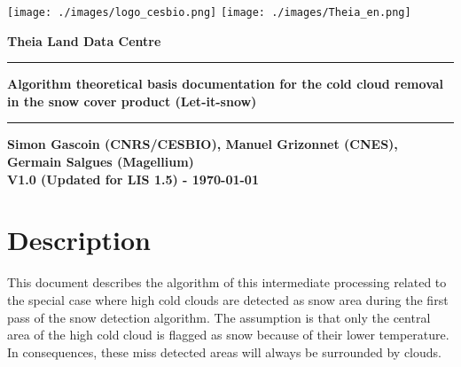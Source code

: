 \documentclass[a4paper]{article}
\date{\today}
\renewcommand{\maketitle}{}
\begin{document}
\maketitle
\pagestyle{fancy}
\rhead[]{\thepage}

\begin{titlepage}
\texttt{[image: ./images/logo\_cesbio.png]}
\hspace{5cm}
\texttt{[image: ./images/Theia\_en.png]}

\vspace{3cm}



\textcolor{PineGreen}{ \huge \bfseries Theia Land Data Centre\\ }
\rule{\linewidth}{0.5mm}
\begin{center}
{ \huge \bfseries Algorithm theoretical basis documentation for the cold cloud removal in
the snow cover product (Let-it-snow)\\}
\rule{\linewidth}{0.5mm}
{ \large \bfseries Simon Gascoin (CNRS/CESBIO), Manuel Grizonnet (CNES), Germain Salgues (Magellium) \\ }
{ \large \bfseries V1.0 (Updated for LIS 1.5) - \today \\ }



\end{center}
\end{titlepage}


\section{Description}\label{par:desc}

This document describes the algorithm of this intermediate processing related to
the special case where high cold clouds are detected as snow area during the
first pass of the snow detection algorithm. The assumption is that only the
central area of the high cold cloud is flagged as snow because of their lower
temperature. In consequences, these miss detected areas will always be
surrounded by clouds.
\end{document}
